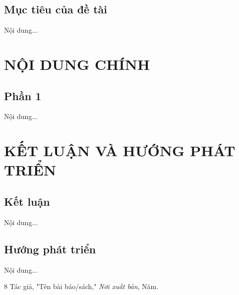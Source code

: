 \documentclass{article} %
\begin{document}
\subsection{Mục tiêu của đề tài}
Nội dung...

\newpage
\section{NỘI DUNG CHÍNH}
\subsection{Phần 1}
Nội dung...

\newpage
\section{KẾT LUẬN VÀ HƯỚNG PHÁT TRIỂN}

\subsection{Kết luận}
Nội dung...

\subsection{Hướng phát triển}
Nội dung...

\newpage
\newpage
\begin{thebibliography}{8}
    Tác giả, "Tên bài báo/sách," \emph{Nơi xuất bản}, Năm.
\end{thebibliography}
\newpage
\end{document}
